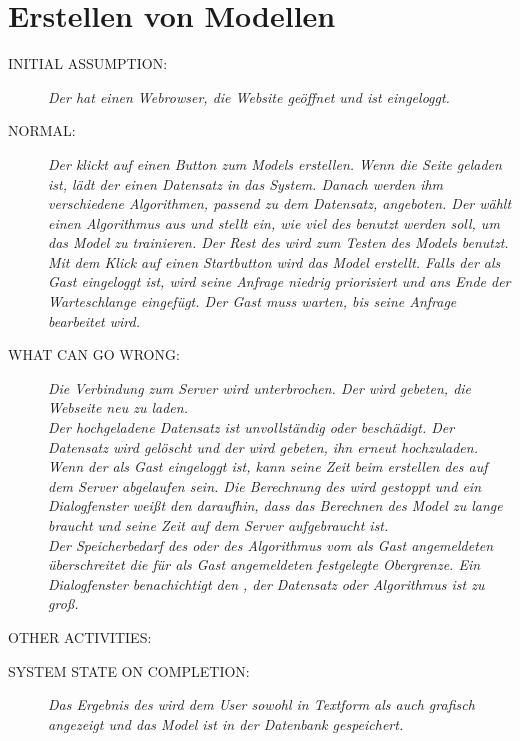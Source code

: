 \section{Erstellen von Modellen}
\begin{description}
  \item [INITIAL ASSUMPTION:]
    \textit{Der  hat einen Webrowser, die Website geöffnet und ist eingeloggt.}
  \item [NORMAL:]
    \textit{Der  klickt auf einen Button zum \glspl{Model} erstellen. Wenn die Seite geladen ist, lädt der  einen \gls{Datensatz} in das System. Danach werden ihm verschiedene Algorithmen, passend zu dem \gls{Datensatz}, angeboten. Der  wählt einen Algorithmus aus und stellt ein, wie viel des  benutzt werden soll, um das \gls{Model} zu trainieren. Der Rest des  wird zum Testen des \gls{Model}s benutzt. Mit dem Klick auf einen Startbutton wird das \gls{Model} erstellt. Falls der  als \gls{Gast} eingeloggt ist, wird seine Anfrage niedrig priorisiert und ans Ende der Warteschlange eingefügt. Der \gls{Gast} muss warten, bis seine Anfrage bearbeitet wird.}
  \item [WHAT CAN GO WRONG:]
    \textit{Die Verbindung zum Server wird unterbrochen. Der  wird gebeten, die Webseite neu zu laden.\\
Der hochgeladene \gls{Datensatz} ist unvollständig oder beschädigt. Der \gls{Datensatz} wird gelöscht und der  wird gebeten, ihn erneut hochzuladen.\\
Wenn der  als \gls{Gast} eingeloggt ist, kann seine Zeit beim erstellen des  auf dem Server abgelaufen sein. Die Berechnung des  wird gestoppt und ein Dialogfenster weißt den  daraufhin, dass das Berechnen des \gls{Model} zu lange braucht und seine Zeit auf dem Server aufgebraucht ist.\\
Der Speicherbedarf des  oder des Algorithmus vom als \gls{Gast} angemeldeten  überschreitet die für als \gls{Gast} angemeldeten  festgelegte Obergrenze. Ein Dialogfenster benachichtigt den , der \gls{Datensatz} oder Algorithmus ist zu groß.}
 \item [OTHER ACTIVITIES:]
	 \textit{ }
  \item [SYSTEM STATE ON COMPLETION:]
    \textit{Das Ergebnis des  wird dem User sowohl in Textform als auch grafisch angezeigt und das \gls{Model} ist in der Datenbank gespeichert.}
\end{description}

